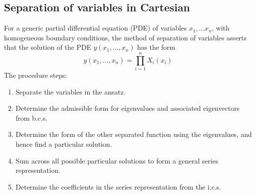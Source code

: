 \documentclass[a4paper]{article}
\begin{document}
\subsection{Separation of variables in Cartesian}
\begin{defi}
For a generic partial differential equation (PDE) of variables $x_1,\dots x_n$, with homogeneous boundary conditions, the method of separation of variables asserts that the solution of the PDE $y(x_1,\dots, x_n)$ has the form
\begin{equation}
    y(x_1,\dots,x_n)=\prod_{i=1}^nX_i(x_i)\tag{2.9}
\end{equation}
The procedure steps:
\begin{enumerate}
    \item Separate the variables in the ansatz.
    \item Determine the admissible form for eigenvalues and associated eigenvectors from b.c.s.
    \item Determine the form of the other separated function using the eigenvalues, and hence find a particular solution.
    \item Sum across all possible particular solutions to form a general series representation.
    \item Determine the coefficients in the series representation from the i.c.s.
\end{enumerate}
\end{defi}
\newpage
\end{document}
